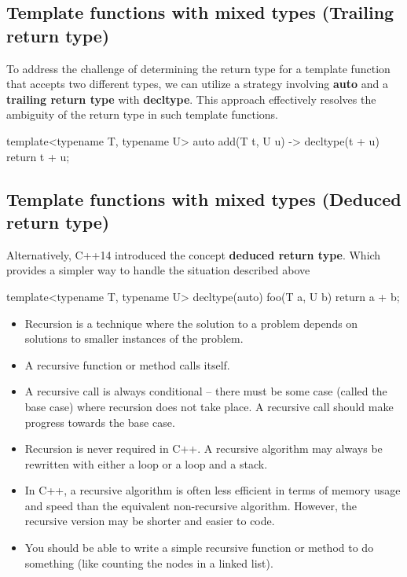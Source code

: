 \documentclass{report}
\begin{document}
    \bigbreak \noindent 
    \subsection{Template functions with mixed types (Trailing return type)}
    \bigbreak \noindent 
    \begin{concept}
        To address the challenge of determining the return type for a template function that accepts two different types, we can utilize a strategy involving \textbf{auto} and a \textbf{trailing return type} with \textbf{decltype}. This approach effectively resolves the ambiguity of the return type in such template functions.
    \end{concept}
    \bigbreak \noindent 
    \begin{cppcode}
        template<typename T, typename U>
        auto add(T t, U u) -> decltype(t + u) {
            return t + u;
        }
    \end{cppcode}

    \bigbreak \noindent 
    \subsection{Template functions with mixed types (Deduced return type)}
    Alternatively, C++14 introduced the concept \textbf{deduced return type}. Which provides a simpler way to handle the situation described above
    \bigbreak \noindent 
    \begin{cppcode}
        template<typename T, typename U>
        decltype(auto) foo(T a, U b)  {
            return a + b;
        }
    \end{cppcode}

    \pagebreak 
    \bigbreak \noindent 
    \begin{itemize}
        \item Recursion is a technique where the solution to a problem depends on solutions to smaller instances of the problem.
        \item A recursive function or method calls itself.
        \item A recursive call is always conditional – there must be some case (called the base case) where recursion does not take place. A recursive call should make progress towards the base case.
        \item Recursion is never required in C++. A recursive algorithm may always be rewritten with either a loop or a loop and a stack.
        \item In C++, a recursive algorithm is often less efficient in terms of memory usage and speed than the equivalent non-recursive algorithm. However, the recursive version may be shorter and easier to code.
        \item You should be able to write a simple recursive function or method to do something (like counting the nodes in a linked list).
    \end{itemize}
\end{document}
